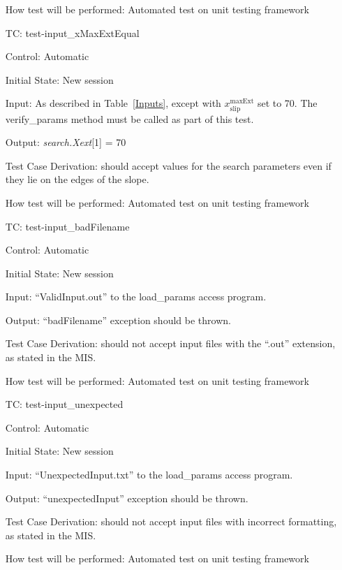 \documentclass[12pt, titlepage]{article}
\newcounter{utestnum} %
\begin{document}
\begin{enumerate}[label=TC\arabic*:,ref={\arabic*}]
How test will be performed: Automated test on unit testing framework

\item [TC\refstepcounter{utestnum}\theutestnum: \label{TC_InputXMaxExtEqual}] 
test-input\_xMaxExtEqual

Control: Automatic

Initial State: New session

Input: As described in Table~\ref{Inputs}, except with 
${x_\text{slip}^\text{maxExt}}$ set to 70.  The verify\_params method must be 
called as part of this test.

Output: \textit{search.Xext}[1] = 70

Test Case Derivation: \progname{} should accept values for the search 
parameters even if they lie on the edges of the slope.

How test will be performed: Automated test on unit testing framework

\item [TC\refstepcounter{utestnum}\theutestnum: \label{TC_InputBadFilename}] 
test-input\_badFilename

Control: Automatic

Initial State: New session

Input: ``ValidInput.out'' to the load\_params access program.

Output: ``badFilename'' exception should be thrown.

Test Case Derivation: \progname{} should not accept input files with the 
``.out'' extension, as stated in the MIS.

How test will be performed: Automated test on unit testing framework

\item [TC\refstepcounter{utestnum}\theutestnum: \label{TC_InputUnexpected}] 
test-input\_unexpected

Control: Automatic

Initial State: New session

Input: ``UnexpectedInput.txt'' to the load\_params access program.

Output: ``unexpectedInput'' exception should be thrown.

Test Case Derivation: \progname{} should not accept input files with incorrect 
formatting, as stated in the MIS.

How test will be performed: Automated test on unit testing framework
    
\end{enumerate}
\end{document}

